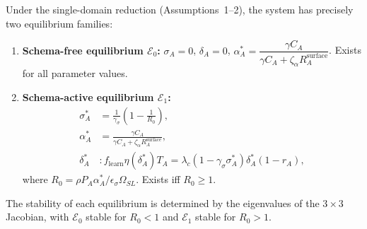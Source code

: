 \begin{proposition}
\label{prop:equilibria}
Under the single-domain reduction (Assumptions~1--2), the system has
precisely two equilibrium families:
\begin{enumerate}[nosep]
\item \textbf{Schema-free equilibrium $\mathcal{E}_0$:}
  $\sigma_A = 0$, $\delta_A = 0$,
  $\alpha_A^* = \dfrac{\gamma C_A}{\gamma C_A + \zeta_\alpha R_A^{\text{surface}}}$.
  Exists for all parameter values.

\item \textbf{Schema-active equilibrium $\mathcal{E}_1$:}
  \begin{align*}
  \sigma_A^* &= \frac{1}{\gamma_\sigma}\left(1 - \frac{1}{R_0}\right), \\
  \alpha_A^* &= \frac{\gamma C_A}{\gamma C_A + \zeta_\alpha R_A^{\text{surface}}},\\
  \delta_A^* &: f_{\text{learn}} \eta(\delta_A^*) T_A = \lambda_c (1 - \gamma_\sigma \sigma_A^*) \delta_A^* (1 - r_A),
  \end{align*}
  where $R_0 = \rho P_A \alpha_A^* / \epsilon_\sigma \Omega_{SL}$.
  Exists iff $R_0 \geq 1$.
\end{enumerate}
The stability of each equilibrium is determined by the eigenvalues of
the $3\times 3$ Jacobian, with $\mathcal{E}_0$ stable for $R_0 < 1$
and $\mathcal{E}_1$ stable for $R_0 > 1$.
\end{proposition}

